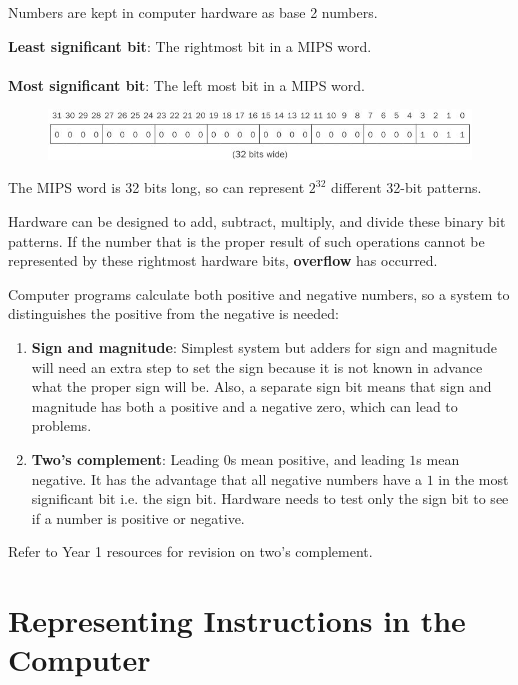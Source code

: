 \documentclass[10pt,a4paper]{article}
\begin{document}
Numbers are kept in computer hardware as base 2 numbers. 
\begin{tcolorbox}[breakable,colback=white]
\textbf{Least significant bit}: The rightmost bit in a MIPS word.
\\
\\
\textbf{Most significant bit}: The left most bit in a MIPS word.
\end{tcolorbox}

\begin{figure} [h!]
    \centering
    \includegraphics[scale=0.7]{32 bit MIPS}
\end{figure}
The MIPS word is 32 bits long, so can represent $2^{32}$ different 32-bit patterns. 

Hardware can be designed to add, subtract, multiply, and divide these binary bit patterns. If the
number that is the proper result of such operations cannot be represented by these rightmost
hardware bits, \textbf{overflow} has occurred. 

Computer programs calculate both positive and negative numbers, so a system to distinguishes the
positive from the negative is needed:
\begin{enumerate}
    \item \textbf{Sign and magnitude}: Simplest system but adders for sign and magnitude will need
    an extra step to set the sign because it is not known in advance what the proper sign will be.
    Also, a separate sign bit means that sign and magnitude has both a positive and a negative 
    zero, which can lead to problems.
    \item \textbf{Two’s complement}: Leading $0$s mean positive, and leading $1$s mean negative. It
    has the advantage that all negative numbers have a $1$ in the most significant bit i.e. the sign
    bit. Hardware needs to test only the sign bit to see if a number is positive or negative.
\end{enumerate}

Refer to Year 1 resources for revision on two's complement.

\section{Representing Instructions in the Computer}
\end{document}
